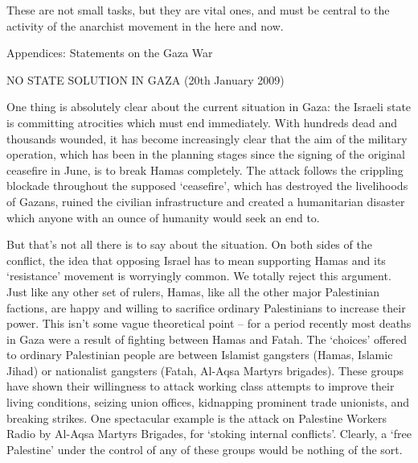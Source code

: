 These are not small tasks, but they are vital ones, and must be central to the activity of the anarchist movement in the here and now.

Appendices: Statements on the Gaza War

NO STATE SOLUTION IN GAZA (20th January 2009)

One thing is absolutely clear about the current situation in Gaza: the Israeli state is
committing atrocities which must end immediately. With hundreds dead and thousands
wounded, it has become increasingly clear that the aim of the military operation,
which has been in the planning stages since the signing of the original ceasefire in June,
is to break Hamas completely. The attack follows the crippling blockade throughout the
supposed ‘ceasefire’, which has destroyed the livelihoods of Gazans, ruined the civilian
infrastructure and created a humanitarian disaster which anyone with an ounce of
humanity would seek an end to.

But that’s not all there is to say about the situation. On both sides of the conflict, the
idea that opposing Israel has to mean supporting Hamas and its ‘resistance’ movement
is worryingly common. We totally reject this argument. Just like any other set of rulers,
Hamas, like all the other major Palestinian factions, are happy and willing to sacrifice
ordinary Palestinians to increase their power. This isn’t some vague theoretical point –
for a period recently most deaths in Gaza were a result of fighting between Hamas and
Fatah. The ‘choices’ offered to ordinary Palestinian people are between Islamist gangsters
(Hamas, Islamic Jihad) or nationalist gangsters (Fatah, Al-Aqsa Martyrs brigades).
These groups have shown their willingness to attack working class attempts to improve
their living conditions, seizing union offices, kidnapping prominent trade unionists, and
breaking strikes. One spectacular example is the attack on Palestine Workers Radio by
Al-Aqsa Martyrs Brigades, for ‘stoking internal conflicts’. Clearly, a ‘free Palestine’
under the control of any of these groups would be nothing of the sort.

